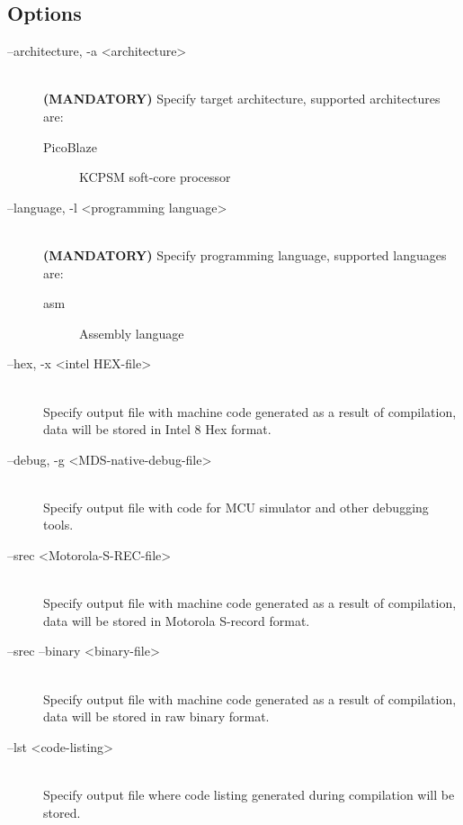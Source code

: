     \subsection{Options}
        \begin{description}
            \item[--architecture, -a <architecture>]~\\
                \textbf{(MANDATORY)} Specify target architecture, supported architectures are:
                \begin{description}
                    \item[PicoBlaze] KCPSM soft-core processor
                \end{description}

            \item[--language, -l <programming language>]~\\
                \textbf{(MANDATORY)} Specify programming language, supported languages are:
                \begin{description}
                    \item[asm] Assembly language
                \end{description}

            \item[--hex, -x <intel HEX-file>]~\\
                Specify output file with machine code generated as a result of compilation, data will be stored in Intel 8 Hex format.

            \item[--debug, -g <MDS-native-debug-file>]~\\
                Specify output file with code for MCU simulator and other debugging tools.

            \item[--srec <Motorola-S-REC-file>]~\\
                Specify output file with machine code generated as a result of compilation, data will be stored in Motorola S-record format.

            \item[--srec --binary <binary-file>]~\\
                Specify output file with machine code generated as a result of compilation, data will be stored in raw binary format.

            \item[--lst <code-listing>]~\\
                Specify output file where code listing generated during compilation will be stored.


\end{description}
